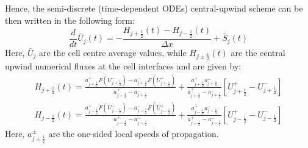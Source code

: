 \documentclass[%
]{USN-PhD}
\begin{document}
Hence, the semi-discrete (time-dependent ODEs) central-upwind scheme can be then written in the following form:
\begin{equation}\label{eq:eq7}
\frac{d}{dt}\bar{U}_j\left(t\right)=-\frac{H_{j+\frac{1}{2}}\left(t\right)-H_{j-\frac{1}{2}}\left(t\right)}{\Delta x}+\bar{S}_j\left(t\right)
\end{equation}
Here, $\bar{U}_j$ are the cell centre average values, while $H_{j\pm\frac{1}{2}}\left(t\right)$ are the central upwind numerical fluxes at the cell interfaces and are given by:
\begin{equation}\label{eq:eq8}
\begin{array}{c}
H_{j+\frac{1}{2}}\left(t\right)=\frac{a^+_{j+\frac{1}{2}}F\left(U^-_{j+\frac{1}{2}}\right)-a^-_{j+\frac{1}{2}}F\left(U^+_{j+\frac{1}{2}}\right)}{a^+_{j+\frac{1}{2}}-a^-_{j+\frac{1}{2}}}+\frac{a^+_{j+\frac{1}{2}}a^-_{j+\frac{1}{2}}}{a^+_{j+\frac{1}{2}}-a^-_{j+\frac{1}{2}}}\left[U^+_{j+\frac{1}{2}}-U^-_{j+\frac{1}{2}}\right]\\
H_{j-\frac{1}{2}}\left(t\right)=\frac{a^+_{j-\frac{1}{2}}F\left(U^-_{j-\frac{1}{2}}\right)-a^-_{j-\frac{1}{2}}F\left(U^+_{j-\frac{1}{2}}\right)}{a^+_{j-\frac{1}{2}}-a^-_{j-\frac{1}{2}}}+\frac{a^+_{j-\frac{1}{2}}a^-_{j-\frac{1}{2}}}{a^+_{j-\frac{1}{2}}-a^-_{j-\frac{1}{2}}}\left[U^+_{j-\frac{1}{2}}-U^-_{j-\frac{1}{2}}\right]
\end{array}
\end{equation}
Here, $a^\pm_{j\pm\frac{1}{2}}$ are the one-sided local speeds of propagation.
\end{document}
